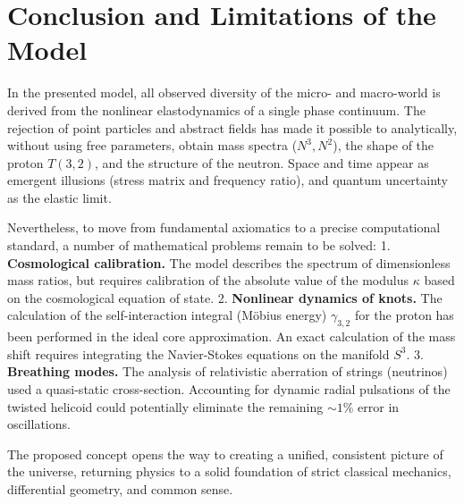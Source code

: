 \documentclass[11pt,a4paper]{article}
\begin{document}
\section*{Conclusion and Limitations of the Model}

In the presented model, all observed diversity of the micro- and macro-world is derived from the nonlinear elastodynamics of a single phase continuum. The rejection of point particles and abstract fields has made it possible to analytically, without using free parameters, obtain mass spectra ($N^3, N^2$), the shape of the proton $T(3,2)$, and the structure of the neutron. Space and time appear as emergent illusions (stress matrix and frequency ratio), and quantum uncertainty as the elastic limit.

Nevertheless, to move from fundamental axiomatics to a precise computational standard, a number of mathematical problems remain to be solved:
1. \textbf{Cosmological calibration.} The model describes the spectrum of dimensionless mass ratios, but requires calibration of the absolute value of the modulus $\kappa$ based on the cosmological equation of state.
2. \textbf{Nonlinear dynamics of knots.} The calculation of the self-interaction integral (Möbius energy) $\gamma_{3,2}$ for the proton has been performed in the ideal core approximation. An exact calculation of the mass shift requires integrating the Navier-Stokes equations on the manifold $S^3$.
3. \textbf{Breathing modes.} The analysis of relativistic aberration of strings (neutrinos) used a quasi-static cross-section. Accounting for dynamic radial pulsations of the twisted helicoid could potentially eliminate the remaining $\sim 1\%$ error in oscillations.

The proposed concept opens the way to creating a unified, consistent picture of the universe, returning physics to a solid foundation of strict classical mechanics, differential geometry, and common sense.
	
\end{document}
